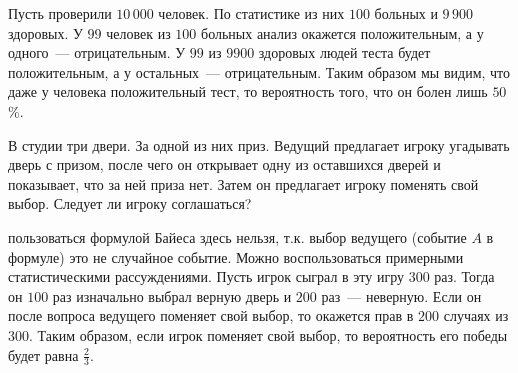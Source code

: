 
Пусть проверили \(10\,000\) человек. По статистике из них \(100\) больных и
\(9\,900\) здоровых. У \(99\) человек из \(100\) больных анализ окажется
положительным, а у одного~--- отрицательным. У \(99\) из \(9900\) здоровых людей
теста будет положительным, а у остальных~--- отрицательным. Таким образом мы
видим, что даже у человека положительный тест, то вероятность того, что он болен
лишь \(50\)\%.

\begin{example}
  В студии три двери. За одной из них приз. Ведущий предлагает игроку
  угадывать дверь с призом, после чего он открывает одну из оставшихся дверей
  и показывает, что за ней приза нет. Затем он предлагает игроку поменять свой
  выбор. Следует ли игроку соглашаться?

  \solution{} пользоваться формулой Байеса здесь нельзя, т.к. выбор ведущего
  (событие \(A\) в формуле) это не случайное событие. Можно воспользоваться
  примерными статистическими рассуждениями. Пусть игрок сыграл в эту игру
  \(300\) раз. Тогда он \(100\) раз изначально выбрал верную дверь и \(200\)
  раз~--- неверную. Если он после вопроса ведущего поменяет свой выбор, то
  окажется прав в \(200\) случаях из \(300\). Таким образом, если игрок поменяет
  свой выбор, то вероятность его победы будет равна \(\frac{2}{3}\).
\end{example}
